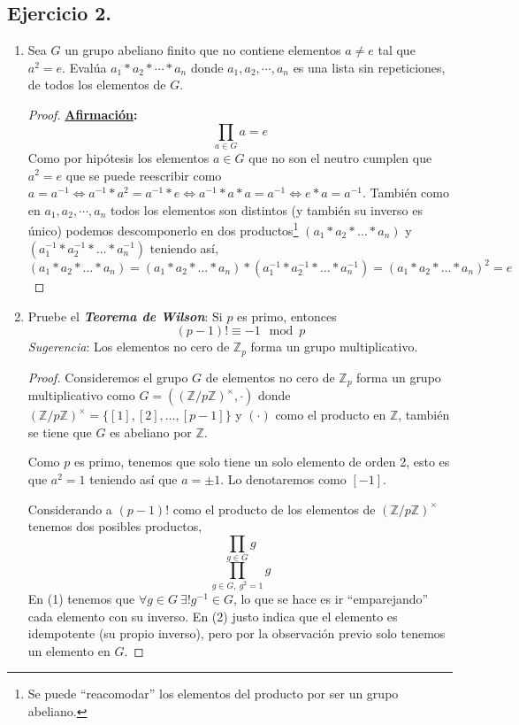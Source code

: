 \documentclass[11pt,letterpaper]{article}
\newcommand{\Z}{\mathbb{Z}}
\newcommand{\af}{\textbf{\underline{Afirmación}: }}
\begin{document}
\subsection*{Ejercicio 2.}
\begin{enumerate}[label=\alph*)]
    \item Sea $G$ un grupo abeliano finito que no contiene elementos $a \not= e$ tal que $a^2 = e$. Evalúa
    $a_1 \ast a_2 \ast \cdots \ast a_n$ donde $a_1, a_2, \cdots, a_n$ es una lista sin repeticiones, de
    todos los elementos de $G$.
    \begin{proof}\af $$\prod_{a \in G} a = e$$
        Como por hipótesis los elementos $a \in G$ que no son el neutro cumplen que $a^2 = e$ que se puede
        reescribir como
        $a = a^{-1} \iff a^{-1} \ast a^2 = a^{-1} \ast e \iff a^{-1} \ast a \ast a = a^{-1} \iff e \ast a = a^{-1}$.
        También como en $a_1, a_2, \cdots, a_n$ todos los elementos son distintos (y también su inverso es único) podemos
        descomponerlo en dos productos\footnote{Se puede ``reacomodar'' los elementos del producto por ser un grupo abeliano.}
        $(a_1 \ast a_2 \ast \ldots \ast a_n)$ y $(a_1^{-1} \ast a_2^{-1} \ast \ldots \ast a_n^{-1})$ teniendo así,
        \[
            (a_1 \ast a_2 \ast \ldots \ast a_n) = (a_1 \ast a_2 \ast \ldots \ast a_n) \ast (a_1^{-1} \ast a_2^{-1} \ast \ldots \ast a_n^{-1}) = 
            (a_1 \ast a_2 \ast \ldots \ast a_n)^2  = e
        \]
    \end{proof}

    \item Pruebe el \textit{\textbf{Teorema de Wilson}}: Si $p$ es primo, entonces
    \[
        (p-1)! \equiv -1 \mod p
    \]
    \textit{Sugerencia}: Los elementos no cero de $\Z_p$ forma un grupo multiplicativo.
    \begin{proof}
        Consideremos el grupo $G$ de elementos no cero de $\Z_p$ forma un grupo multiplicativo como
        $G = ((\Z/p\Z)^\times, \cdot)$ donde $(\Z/p\Z)^\times = \{ [1], [2], \ldots, [p-1] \}$ y $(\cdot)$
        como el producto en $\Z$, también se tiene que $G$ es abeliano por $\Z$.
        
        Como $p$ es primo, tenemos que solo tiene un solo elemento de orden 2, esto es que $a^2 = 1$ teniendo 
        así que $a = \pm 1$. Lo denotaremos como $[-1]$.

        Considerando a $(p-1)!$ como el producto de los elementos de $(\Z/p\Z)^\times$ tenemos dos posibles productos,
        \[ \prod_{g \in G} g \tag{1} \]
        \[ \prod_{g \in G,\ g^2 = 1} g \tag{2} \]
        En (1) tenemos que $\forall g \in G \ \exists! g^{-1} \in G$, lo que se hace es ir ``emparejando''
        cada elemento con su inverso. En (2) justo indica que el elemento es idempotente (su propio inverso), pero 
        por la observación previo solo tenemos un elemento en $G$.


\end{proof}
\end{enumerate}
\end{document}

